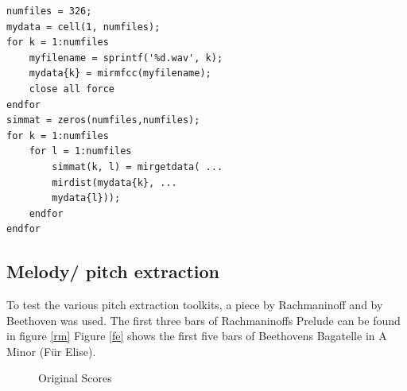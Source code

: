 \lstset{language=Matlab}          %
\FloatBarrier

\begin{lstlisting}[frame=single,label={lst:MIRmat},
caption={MIR Toolkit Similarity},captionpos=b]  % Start your code-block
numfiles = 326;
mydata = cell(1, numfiles);
for k = 1:numfiles
	myfilename = sprintf('%d.wav', k);
	mydata{k} = mirmfcc(myfilename);
	close all force
endfor
simmat = zeros(numfiles,numfiles);
for k = 1:numfiles
	for l = 1:numfiles
		simmat(k, l) = mirgetdata( ...
		mirdist(mydata{k}, ...
		mydata{l}));
	endfor
endfor
\end{lstlisting}
\FloatBarrier


\subsection{Melody/ pitch extraction}\label{midiest}
To test the various pitch extraction toolkits, a piece by Rachmaninoff and by Beethoven was used. The first three bars of Rachmaninoffs Prelude can be found in figure \ref{rm}
Figure \ref{fe} shows the first five bars of Beethovens Bagatelle in A Minor (Für Elise).
\begin{figure}[htbp]
	\centering
	\caption{Original Scores}
	\label{fig:sheets}
\end{figure}

